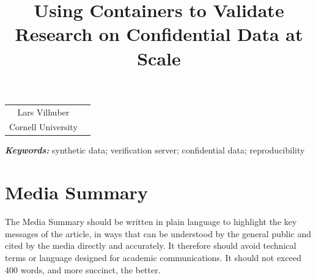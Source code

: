 \documentclass[]{hdsr}
\begin{document}




\begin{center}

  \title{Using Containers to Validate Research on Confidential Data at Scale}
  \maketitle

  \thispagestyle{empty}
  
  \vspace*{.2in}

  \begin{tabular}{cc}
    Lars Vilhuber\upstairs{\affilone,*}
   \\[0.25ex]
   {\small \upstairs{\affilone} Cornell University} \\
  \end{tabular}
  
  \vspace*{0.4in}

\begin{abstract}

\end{abstract}
\end{center}

\vspace*{0.15in}
\hspace{10pt}
  \small	
  \textbf{\textit{Keywords: }} {synthetic data; verification server; confidential data; reproducibility}
  
\copyrightnotice

\section*{Media Summary}
The Media Summary should be written in plain language to highlight the key messages of
the article, in ways that can be understood by the general public and cited by the media 
directly and accurately.  It therefore should avoid technical terms or language designed for
academic communications. It should not exceed 400 words, and more succinct, the better.
\end{document}
